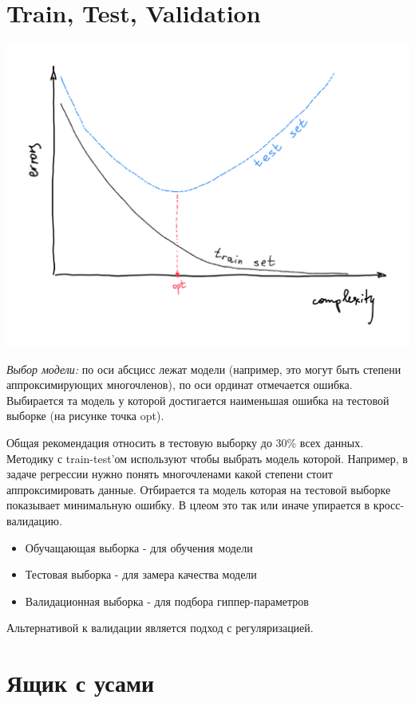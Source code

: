 \documentclass[a4paper, oneside]{book}
\begin{document}
\section{Train, Test, Validation}
\begin{marginfigure}
    \includegraphics[width=1\columnwidth]{pics/choise_of_model.pdf}
    \caption{\emph{Выбор модели:} по оси абсцисс лежат модели (например, это могут быть степени аппроксимирующих многочленов), по оси ординат отмечается ошибка. Выбирается та модель у которой достигается наименьшая ошибка на тестовой выборке (на рисунке точка opt).}
    \label{fig:choise_of_model}
\end{marginfigure}
Общая рекомендация относить в тестовую выборку до 30\% всех данных. Методику с train-test'ом используют чтобы выбрать модель которой. Например, в задаче регрессии нужно понять многочленами какой степени стоит аппроксимировать данные. Отбирается та модель которая на тестовой выборке показывает минимальную ошибку. В цлеом это так или иначе упирается в кросс-валидацию.

\begin{itemize}
    \setlength\itemsep{0em}
    \item Обучащающая выборка - для обучения модели
    \item Тестовая выборка - для замера качества модели
    \item Валидационная выборка - для подбора гиппер-параметров
\end{itemize}

Альтернативой к валидации является подход с регуляризацией.

\section{Ящик с усами}
\end{document}
